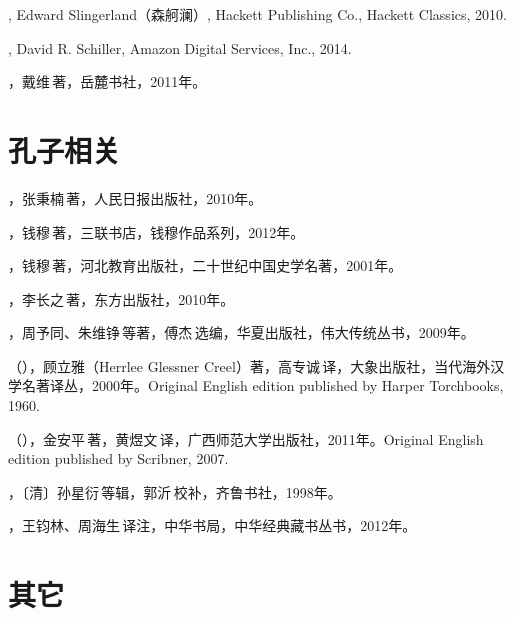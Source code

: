 , Edward Slingerland（森舸澜）, Hackett Publishing Co., Hackett Classics, 2010.

, David R. Schiller, Amazon Digital Services, Inc., 2014.

，戴维\,著，岳麓书社，2011年。


\lypdfbookmark\section*{孔子相关}

，张秉楠\,著，人民日报出版社，2010年。

，钱穆\,著，三联书店，钱穆作品系列，2012年。

，钱穆\,著，河北教育出版社，二十世纪中国史学名著，2001年。

，李长之\,著，东方出版社，2010年。

，周予同、朱维铮\,等著，傅杰\,选编，华夏出版社，伟大传统丛书，2009年。

（），顾立雅（Herrlee Glessner Creel）著，高专诚\,译，大象出版社，当代海外汉学名著译丛，2000年。Original English edition published by Harper Torchbooks, 1960.

（），金安平\,著，黄煜文\,译，广西师范大学出版社，2011年。Original English edition published by Scribner, 2007.

，〔清〕孙星衍\,等辑，郭沂\,校补，齐鲁书社，1998年。

，王钧林、周海生\,译注，中华书局，中华经典藏书丛书，2012年。




\lypdfbookmark\section*{其它}

